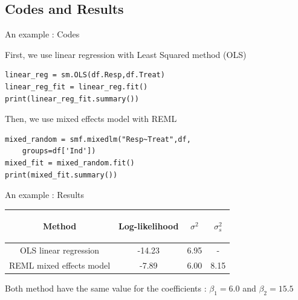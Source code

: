 \documentclass[unknownkeysallowed]{beamer}
\begin{document}
\subsection{Codes and Results}
\label{sub:Codes and Results}


\begin{frame}[fragile]{An example : Codes}

First, we use linear regression with Least Squared method (OLS)
\begin{lstlisting}
linear_reg = sm.OLS(df.Resp,df.Treat)
linear_reg_fit = linear_reg.fit()
print(linear_reg_fit.summary())
\end{lstlisting}
\vspace{0.5cm}
Then, we use mixed effects model with REML
\begin{lstlisting}
mixed_random = smf.mixedlm("Resp~Treat",df,
    groups=df['Ind'])
mixed_fit = mixed_random.fit()
print(mixed_fit.summary())
\end{lstlisting}
\end{frame}



\begin{frame}{An example : Results}

\begin{table}[h!]
    \centering
    \begin{tabular}{| c | c | c|c|}
        \hline
        \begin{bf} Method \end{bf} &
        \begin{bf} Log-likelihood \end{bf} &
        \begin{bf} $\sigma^2$ \end{bf} &
        \begin{bf} $\sigma_s^2$ \end{bf} \\
        \hline
        OLS linear regression &  -14.23 & 6.95 & -\\
        REML mixed effects model  & -7.89 & 6.00 & 8.15 \\
        \hline
    \end{tabular}
\end{table}
\vspace{1cm}
Both method have the same value for the coefficients : $\beta_1=6.0$ and $\beta_2=15.5$
\end{frame}
\end{document}

